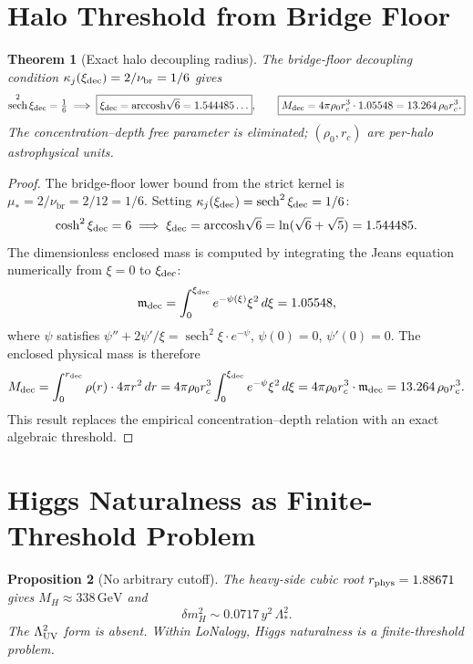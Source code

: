 \documentclass[12pt]{article}
\theoremstyle{plain}
\newtheorem{theorem}{Theorem}[section]
\newtheorem{proposition}[theorem]{Proposition}
\theoremstyle{definition}
\numberwithin{equation}{section}
\newcommand{\br}{\mathrm{br}}
\DeclareMathOperator{\sech}{sech}
\begin{document}
\section{Halo Threshold from Bridge Floor}\label{sec:haloclose}

\begin{theorem}[Exact halo decoupling radius]\label{thm:haloexact}
The bridge-floor decoupling condition $\kappa_j(\xi_{\rm dec})=2/\nu_\br=1/6$ gives
\[
\sech^2\xi_{\rm dec}=\tfrac{1}{6}
\;\Longrightarrow\;
\boxed{\xi_{\rm dec}=\mathrm{arccosh}\sqrt{6}=1.544485\ldots},\qquad
\boxed{M_{\rm dec}=4\pi\rho_0 r_c^3\cdot1.05548=13.264\,\rho_0 r_c^3.}
\]
The concentration--depth free parameter is eliminated; $(\rho_0,r_c)$ are per-halo astrophysical units.
\end{theorem}

\begin{proof}
The bridge-floor lower bound from the strict kernel is $\mu_*=2/\nu_\br=2/12=1/6$.
Setting $\kappa_j(\xi_{\rm dec})=\sech^2\xi_{\rm dec}=1/6$:
\[
\cosh^2\xi_{\rm dec}=6\;\Longrightarrow\;\xi_{\rm dec}=\mathrm{arccosh}\sqrt{6}=\ln(\sqrt{6}+\sqrt{5})=1.544485.
\]
The dimensionless enclosed mass is computed by integrating the Jeans equation numerically from $\xi=0$ to $\xi_{\rm dec}$:
\[
\mathfrak{m}_{\rm dec}=\int_0^{\xi_{\rm dec}}e^{-\psi(\xi)}\xi^2\,d\xi = 1.05548,
\]
where $\psi$ satisfies $\psi''+2\psi'/\xi=\sech^2\xi\cdot e^{-\psi}$, $\psi(0)=0$, $\psi'(0)=0$.
The enclosed physical mass is therefore
\[
M_{\rm dec}=\int_0^{r_{\rm dec}}\rho(r)\cdot4\pi r^2\,dr
=4\pi\rho_0 r_c^3\int_0^{\xi_{\rm dec}}e^{-\psi}\xi^2\,d\xi
=4\pi\rho_0 r_c^3\cdot\mathfrak{m}_{\rm dec}=13.264\,\rho_0 r_c^3.
\]
This result replaces the empirical concentration--depth relation with an exact algebraic threshold.
\end{proof}

\section{Higgs Naturalness as Finite-Threshold Problem}\label{sec:hierarchy}

\begin{proposition}[No arbitrary cutoff]\label{prop:hierarchy}
The heavy-side cubic root $r_{\rm phys}=1.88671$ gives $M_H\approx338\,\mathrm{GeV}$ and
\[
\boxed{\delta m_H^2 \sim 0.0717\,y^2\,\Lambda_*^2.}
\]
The $\Lambda_{\rm UV}^2$ form is absent.  Within LoNalogy, Higgs naturalness is a finite-threshold problem.
\end{proposition}
\end{document}
